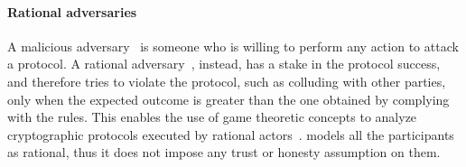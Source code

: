 \paragraph*{Rational adversaries}

A malicious adversary~\cite{Hazay10anote} is someone who is willing to perform any action to attack a protocol. A rational adversary~\cite{Groce2012}, instead, has a stake in the protocol success, and therefore tries to violate the protocol, such as colluding with other parties, only when the expected outcome is greater than the one obtained by complying with the rules. This enables the use of game theoretic concepts to analyze cryptographic protocols executed by rational actors~\cite{Asharov2016,raap,Provi07summaryreport}.
%
\shortname models all the participants as rational, thus it does not impose any trust or honesty assumption on them.